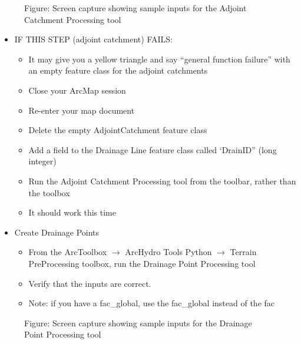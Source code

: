 \documentclass[letterpaper,10pt,english]{sphinxmanual}
\begin{document}
\begin{figure}[htbp]
\centering
\capstart

\noindent{}
\caption{Figure: Screen capture showing sample inputs for the Adjoint Catchment Processing tool}\label{\detokenize{ex_2:id15}}\end{figure}
\begin{itemize}
\item {} 
IF THIS STEP (adjoint catchment) FAILS:
\begin{itemize}
\item {} 
It may give you a yellow triangle and say “general function failure” with an empty feature class for the adjoint catchments

\item {} 
Close your ArcMap session

\item {} 
Re-enter your map document

\item {} 
Delete the empty AdjointCatchment feature class

\item {} 
Add a field to the Drainage Line feature class called ‘DrainID” (long integer)

\item {} 
Run the Adjoint Catchment Processing tool from the toolbar, rather than the toolbox

\item {} 
It should work this time

\end{itemize}

\item {} 
Create Drainage Points
\begin{itemize}
\item {} 
From the ArcToolbox \(\rightarrow\) ArcHydro Tools Python \(\rightarrow\) Terrain PreProcessing toolbox, run the Drainage Point Processing tool

\item {} 
Verify that the inputs are correct.

\item {} 
Note: if you have a fac\_global, use the fac\_global instead of the fac

\end{itemize}

\end{itemize}

\begin{figure}[htbp]
\centering
\capstart

\noindent{}
\caption{Figure: Screen capture showing sample inputs for the Drainage Point Processing tool}\label{\detokenize{ex_2:id16}}\end{figure}
\end{document}
